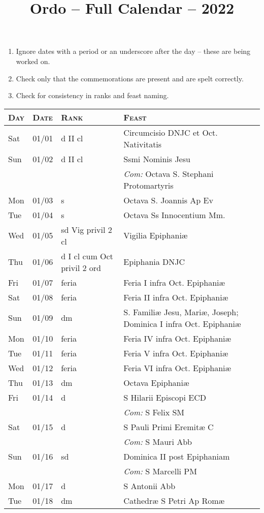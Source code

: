 \documentclass[10pt]{article}
\title{Ordo -- Full Calendar -- 2022}
\begin{document}
\begin{enumerate}
    \item Ignore dates with a period or an underscore after the day -- these are being worked on.
    \item Check only that the commemorations are present and are spelt correctly.
    \item Check for consistency in ranks and feast naming.
\end{enumerate}
\begin{longtable}{ l l l l }
\hline
\textsc{Day} & \textsc{Date} & \textsc{Rank} & \textsc{Feast} \\
\hline
\endhead
Sat & 01/01 & d II cl & Circumcisio DNJC et Oct. Nativitatis\\
Sun & 01/02 & d II cl & Ssmi Nominis Jesu\\
 & & & \textit{Com:} Octava S. Stephani Protomartyris\\
Mon & 01/03 & s & Octava S. Joannis Ap Ev\\
Tue & 01/04 & s & Octava Ss Innocentium Mm.\\
Wed & 01/05 & sd Vig privil 2 cl & Vigilia Epiphaniæ\\
Thu & 01/06 & d I cl cum Oct privil 2 ord & Epiphania DNJC\\
Fri & 01/07 & feria & Feria I infra Oct. Epiphaniæ\\
Sat & 01/08 & feria & Feria II infra Oct. Epiphaniæ\\
Sun & 01/09 & dm & S. Familiæ Jesu, Mariæ, Joseph; Dominica I infra Oct. Epiphaniæ\\
Mon & 01/10 & feria & Feria IV infra Oct. Epiphaniæ\\
Tue & 01/11 & feria & Feria V infra Oct. Epiphaniæ\\
Wed & 01/12 & feria & Feria VI infra Oct. Epiphaniæ\\
Thu & 01/13 & dm & Octava Epiphaniæ\\
Fri & 01/14 & d & S Hilarii Episcopi ECD\\
 & & & \textit{Com:} S Felix SM\\
Sat & 01/15 & d & S Pauli Primi Eremitæ C\\
 & & & \textit{Com:} S Mauri Abb\\
Sun & 01/16 & sd & Dominica II post Epiphaniam\\
 & & & \textit{Com:} S Marcelli PM\\
Mon & 01/17 & d & S Antonii Abb\\
Tue & 01/18 & dm & Cathedræ S Petri Ap Romæ\\

\end{longtable}
\end{document}
